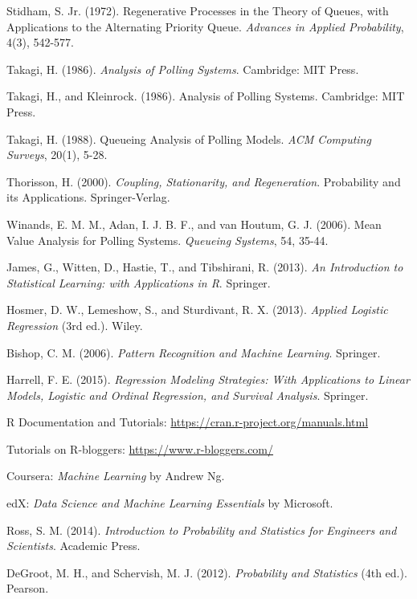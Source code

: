 \begin{thebibliography}{99}
 Stidham, S. Jr. (1972). Regenerative Processes in the Theory of Queues, with Applications to the Alternating Priority Queue. \textit{Advances in Applied Probability}, 4(3), 542-577.

 Takagi, H. (1986). \textit{Analysis of Polling Systems}. Cambridge: MIT Press.

 Takagi, H., and Kleinrock. (1986). Analysis of Polling Systems. Cambridge: MIT Press.

 Takagi, H. (1988). Queueing Analysis of Polling Models. \textit{ACM Computing Surveys}, 20(1), 5-28.

 Thorisson, H. (2000). \textit{Coupling, Stationarity, and Regeneration}. Probability and its Applications. Springer-Verlag.

 Winands, E. M. M., Adan, I. J. B. F., and van Houtum, G. J. (2006). Mean Value Analysis for Polling Systems. \textit{Queueing Systems}, 54, 35-44.

 James, G., Witten, D., Hastie, T., and Tibshirani, R. (2013). \textit{An Introduction to Statistical Learning: with Applications in R}. Springer.

 Hosmer, D. W., Lemeshow, S., and Sturdivant, R. X. (2013). \textit{Applied Logistic Regression} (3rd ed.). Wiley.

 Bishop, C. M. (2006). \textit{Pattern Recognition and Machine Learning}. Springer.

 Harrell, F. E. (2015). \textit{Regression Modeling Strategies: With Applications to Linear Models, Logistic and Ordinal Regression, and Survival Analysis}. Springer.

 R Documentation and Tutorials: \url{https://cran.r-project.org/manuals.html}

 Tutorials on R-bloggers: \url{https://www.r-bloggers.com/}

 Coursera: \textit{Machine Learning} by Andrew Ng.

 edX: \textit{Data Science and Machine Learning Essentials} by Microsoft.

 Ross, S. M. (2014). \textit{Introduction to Probability and Statistics for Engineers and Scientists}. Academic Press.

 DeGroot, M. H., and Schervish, M. J. (2012). \textit{Probability and Statistics} (4th ed.). Pearson.


\end{thebibliography}
